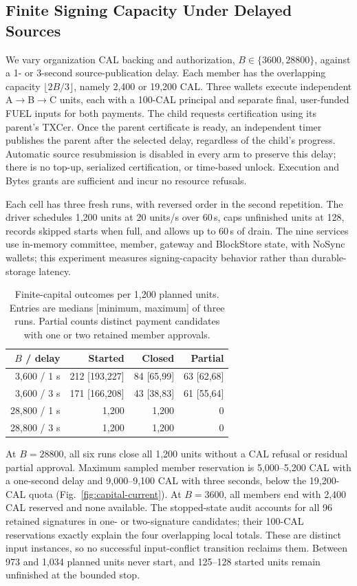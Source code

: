 \subsection{Finite Signing Capacity Under Delayed Sources}
\label{sec:eval-capital}

We vary organization CAL backing and authorization, $B\in\{3600,28800\}$,
against a 1- or 3-second source-publication delay. Each member has the
overlapping capacity $\lfloor2B/3\rfloor$, namely 2,400 or 19,200 CAL.
Three wallets execute independent A$\to$B$\to$C units, each with a
100-CAL principal and separate final, user-funded FUEL inputs for both
payments. The child requests certification using its parent's TXCer.
Once the parent certificate is ready, an independent timer publishes
the parent after the selected delay, regardless of the child's progress.
Automatic source resubmission is disabled in every arm to preserve this
delay; there is no top-up, serialized certification, or time-based unlock.
Execution and Bytes grants are sufficient and incur no resource refusals.

Each cell has three fresh runs, with reversed order in the second
repetition. The driver schedules 1,200 units at 20 units/s over 60\,s,
caps unfinished units at 128, records skipped starts when full, and
allows up to 60\,s of drain. The nine services use in-memory committee,
member, gateway and BlockStore state, with NoSync wallets; this experiment
measures signing-capacity behavior rather than durable-storage latency.

\begin{table}[t]\centering\small
\caption{Finite-capital outcomes per 1,200 planned units. Entries are
  medians [minimum, maximum] of three runs. Partial counts distinct
  payment candidates with one or two retained member approvals.}
\label{tab:capital-current}
\setlength{\tabcolsep}{3pt}
\begin{tabular}{@{}rrrr@{}}\toprule
$B$ / delay & Started & Closed & Partial \\\midrule
3,600 / 1 s & 212 [193,227] & 84 [65,99] & 63 [62,68] \\
3,600 / 3 s & 171 [166,208] & 43 [38,83] & 61 [55,64] \\
28,800 / 1 s & 1,200 & 1,200 & 0 \\
28,800 / 3 s & 1,200 & 1,200 & 0 \\
\bottomrule\end{tabular}\end{table}

At $B=28800$, all six runs close all 1,200 units without a CAL refusal
or residual partial approval. Maximum sampled member reservation is
5,000--5,200 CAL with a one-second delay and 9,000--9,100 CAL with
three seconds, below the 19,200-CAL quota (Fig.~\ref{fig:capital-current}).
At $B=3600$, all members end with 2,400 CAL reserved and none available.
The stopped-state audit accounts for all 96 retained signatures in
one- or two-signature candidates; their 100-CAL reservations exactly
explain the four overlapping local totals. These are distinct input
instances, so no successful input-conflict transition reclaims them.
Between 973 and 1,034 planned units never start, and 125--128 started
units remain unfinished at the bounded stop.

